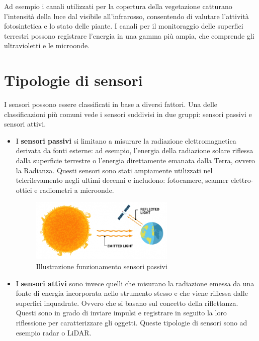 Ad esempio i canali utilizzati per la copertura della vegetazione catturano 
l'intensità della luce dal visibile all'infrarosso, consentendo di valutare l'attività fotosintetica e lo stato 
delle piante. I canali per il monitoraggio delle superfici terrestri possono registrare 
l'energia in una gamma più ampia, che comprende gli ultravioletti e le microonde.

\section{Tipologie di sensori}
I sensori possono essere classificati in base a diversi fattori.
Una delle classificazioni più comuni vede i sensori suddivisi in due gruppi: sensori passivi e 
sensori attivi. 
\begin{itemize}
    \item I \textbf{sensori passivi} si limitano a misurare la radiazione elettromagnetica derivata da 
    fonti esterne: ad esempio, l’energia della radiazione solare riflessa dalla superficie 
    terrestre o l’energia direttamente emanata dalla Terra, ovvero la Radianza. 
    Questi sensori sono stati ampiamente utilizzati nel telerilevamento negli ultimi decenni e includono: 
    fotocamere, scanner elettro-ottici e radiometri a microonde.

    \begin{figure}[H]
        \centering
        \includegraphics[width=0.65\textwidth]{Immagini/Generiche/Passive-Remote-Sensing.png}
        \caption{Illustrazione funzionamento sensori passivi \cite{GISGeography_RemoteSensing}}
    \end{figure}

    \item I \textbf{sensori attivi} sono invece quelli che misurano la radiazione emessa da una fonte 
    di energia incorporata nello strumento stesso e che viene riflessa dalle superfici 
    inquadrate. Ovvero che si basano sul concetto della riflettanza. Questi sono in grado di inviare impulsi e registrare in seguito la loro 
    riflessione per caratterizzare gli oggetti. Queste tipologie di sensori
    sono ad esempio radar o LiDAR.


\end{itemize}

